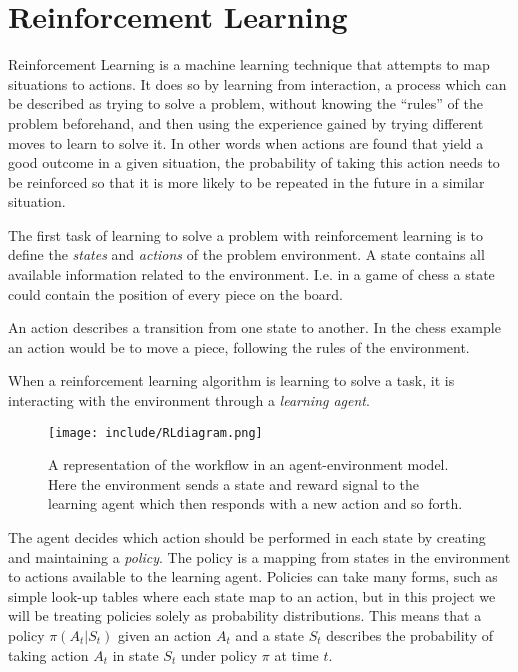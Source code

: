 \documentclass[11pt]{article}
\begin{document}
\maketitle

\section{Reinforcement Learning}

Reinforcement Learning is a machine learning technique that attempts 
to map situations to actions.
It does so by learning from interaction, a process which can be described as trying to solve a problem,
without knowing the “rules” of the problem beforehand,
and then using the experience gained by trying different moves to learn to solve it.
In other words when actions are found that yield a good outcome in a given situation,
the probability of taking this action needs to be reinforced so that it is more likely to be
repeated in the future in a similar situation.

The first task of learning to solve a problem with reinforcement learning is to define
the \textit{states} and \textit{actions} of the problem environment.
A state contains all available information related to the environment.
I.e. in a game of chess a state could contain the position of every piece on the board.

An action describes a transition from one state to another.
In the chess example an action would be to move a piece, following the rules of the
environment.

When a reinforcement learning algorithm is learning to solve a task, it is
interacting with the environment through a \textit{learning agent}.
\begin{figure}[!h]
    \centering
    \texttt{[image: include/RLdiagram.png]}
    \caption{A representation of the workflow in an agent-environment
    model. Here the environment sends a state and reward signal to the
    learning agent which then responds with a new action and so forth.}
    \label{fig:agent_enviroment}
\end{figure}

The agent decides which action should be performed in each state by creating and maintaining a \textit{policy}.
The policy is a mapping from states in the environment to actions available to the learning agent\cite{RLBook}.
Policies can take many forms, such as simple look-up tables where each state map to an
action, but in this project we will be treating policies solely as probability distributions.
This means that a policy $\pi(A_t|S_t)$ given an action $A_t$ and a state $S_t$ describes the
probability of taking action $A_t$ in state $S_t$ under policy $\pi$ at time $t$.
\end{document}
